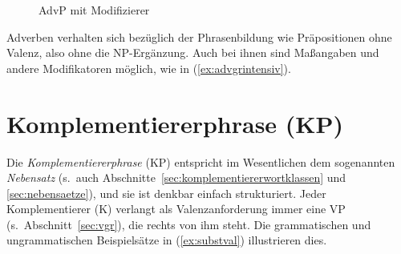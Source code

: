 \label{sec:advgr}



\begin{figure}
  \centering
  \caption{AdvP mit Modifizierer}
  \label{fig:advgrintensiv}
\end{figure}

Adverben verhalten sich bezüglich der Phrasenbildung wie Präpositionen ohne Valenz, also ohne die NP-Ergänzung.
Auch bei ihnen sind Maßangaben und andere Modifikatoren möglich, wie in (\ref{ex:advgrintensiv}).

\begin{exe}
  \ex\label{ex:advgrintensiv} 
  \begin{xlist}
  \end{xlist}
\end{exe}

\section{Komplementiererphrase (KP)}

\label{sec:subjgr}


Die \textit{Komplementiererphrase} (KP) entspricht im Wesentlichen dem sogenannten \textit{Nebensatz} (s.\ auch Abschnitte~\ref{sec:komplementiererwortklassen} und \ref{sec:nebensaetze}), und sie ist denkbar einfach strukturiert.
Jeder Komplementierer (K) verlangt als Valenzanforderung immer eine VP (s.\ Abschnitt~\ref{sec:vgr}), die rechts von ihm steht.
Die grammatischen und ungrammatischen Beispielsätze in (\ref{ex:substval}) illustrieren dies.


